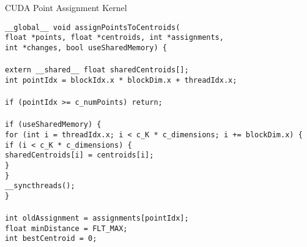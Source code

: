 \documentclass[12pt,a4paper]{article}
\begin{document}
\begin{algorithm}[H]
\caption{CUDA Point Assignment Kernel}
\label{alg:cuda_assignment}
\begin{flushleft}
\texttt{\_\_global\_\_ void assignPointsToCentroids(}\\
\hspace{1cm}\texttt{float *points, float *centroids, int *assignments,}\\
\hspace{1cm}\texttt{int *changes, bool useSharedMemory) \{}\\
\\
\hspace{1cm}\texttt{extern \_\_shared\_\_ float sharedCentroids[];}\\
\hspace{1cm}\texttt{int pointIdx = blockIdx.x * blockDim.x + threadIdx.x;}\\
\\
\hspace{1cm}\texttt{if (pointIdx >= c\_numPoints) return;}\\
\\
\hspace{1cm}\texttt{if (useSharedMemory) \{}\\
\hspace{2cm}\texttt{for (int i = threadIdx.x; i < c\_K * c\_dimensions; i += blockDim.x) \{}\\
\hspace{3cm}\texttt{if (i < c\_K * c\_dimensions) \{}\\
\hspace{4cm}\texttt{sharedCentroids[i] = centroids[i];}\\
\hspace{3cm}\texttt{\}}\\
\hspace{2cm}\texttt{\}}\\
\hspace{2cm}\texttt{\_\_syncthreads();}\\
\hspace{1cm}\texttt{\}}\\
\\
\hspace{1cm}\texttt{int oldAssignment = assignments[pointIdx];}\\
\hspace{1cm}\texttt{float minDistance = FLT\_MAX;}\\
\hspace{1cm}\texttt{int bestCentroid = 0;}\\

\end{flushleft}
\end{algorithm}
\end{document}

